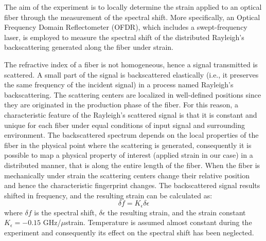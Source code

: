 The aim of the experiment is to locally determine the strain applied to an optical fiber through the measurement of the spectral shift. More specifically, an Optical Frequency Domain Reflectometer (OFDR), which includes a swept-frequency laser, is employed to measure the spectral shift of the distributed Rayleigh's backscattering generated along the fiber under strain.

The refractive index of a fiber is not homogeneous, hence a signal transmitted is scattered. A small part of the signal is backscattered elastically (i.e., it preserves the same frequency of the incident signal) in a process named Rayleigh's backscattering. The scattering centers are localized in well-defined positions since they are originated in the production phase of the fiber. For this reason, a characteristic feature of the Rayleigh's scattered signal is that it is constant and unique for each fiber under equal conditions of input signal and surrounding environment.
The backscattered spectrum depends on the local properties of the fiber in the physical point where the scattering is generated, consequently it is possible to map a physical property of interest (applied strain in our case) in a distributed manner, that is along the entire length of the fiber.
When the fiber is mechanically under strain the scattering centers change their relative position and hence the characteristic fingerprint changes. The backscattered signal results shifted in frequency, and the resulting strain can be calculated as: $$\delta f = K_{\epsilon}\delta \epsilon$$ where $\delta f$ is the spectral shift, $\delta\epsilon$ the resulting strain, and the strain constant $ K_{\epsilon} = -0.15 $ GHz/$\mu$strain. Temperature is assumed almost constant during the experiment and consequently its effect on the spectral shift has been neglected.

